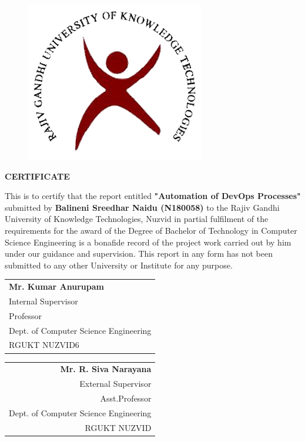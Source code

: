 \documentclass[12pt,a4paper,oneside]{report}
\begin{document}
\begin{figure}[hbt]
\centering
\centerline{\includegraphics[scale=0.25]{images/rgukt.png}}
\end{figure}

\begin{center} 
{\Large  \textbf{CERTIFICATE}}\end{center}
\begin{spacing}{1.5}
This is to certify that the report entitled \textbf{"Automation of DevOps Processes"} submitted by \textbf{Balineni Sreedhar Naidu (N180058)} to the Rajiv Gandhi University of Knowledge Technologies, Nuzvid in partial fulfilment of the requirements for the award of the Degree of Bachelor of Technology in Computer Science Engineering is a bonafide record of the project work carried out by him under our guidance and supervision. This report in any form has not been submitted to any other University or Institute for any purpose.\end{spacing}
\vspace{2cm}
\noindent
\begin{tabular}[t]{@{}l}
\textbf{Mr. Kumar Anurupam }\\ Internal Supervisor\\Professor\\Dept. of Computer Science Engineering \\RGUKT NUZVID6
\end{tabular}
\hfill
\begin{tabular}[t]{@{}r}
\textbf{Mr. R. Siva Narayana}\\External Supervisor\\Asst.Professor\\Dept. of Computer Science Engineering\\RGUKT NUZVID
\end{tabular}
\end{document}
